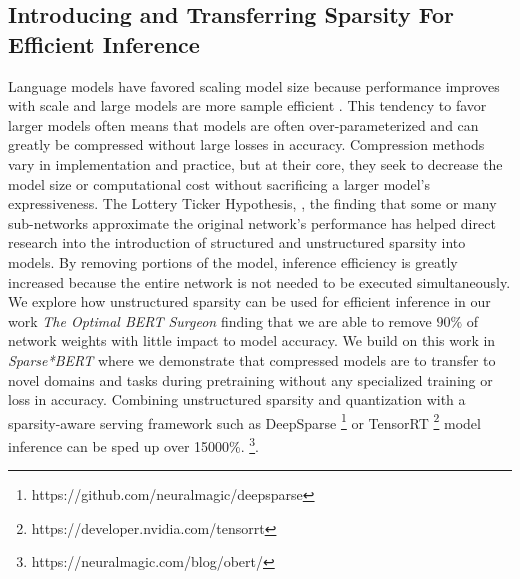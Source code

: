 \subsection{Introducing and Transferring Sparsity For Efficient Inference}
Language models have favored scaling model size because performance improves with scale \cite{Hestness2017DeepLS} \cite{Hernandez2021ScalingLF} and large models are more sample efficient \cite{Kaplan2020ScalingLF}. This tendency to favor larger models often means that models are often over-parameterized and can greatly be compressed without large losses in accuracy. Compression methods vary in implementation and practice, but at their core, they seek to decrease the model size or computational cost without sacrificing a larger model's expressiveness. The Lottery Ticker Hypothesis, \cite{Frankle2019TheLT}, \cite{Chen2020TheLT} the finding that some or many sub-networks approximate the original network's performance has helped direct research into the introduction of structured and unstructured sparsity into models. By removing portions of the model, inference efficiency is greatly increased because the entire network is not needed to be executed simultaneously. \\
We explore how unstructured sparsity can be used for efficient inference in our work 
 \textit{The Optimal BERT Surgeon} \cite{Kurtic2022TheOB} finding that we are able to remove $90\%$ of network weights with little impact to model accuracy. We build on this work in \textit{Sparse*BERT} \cite{Campos2022SparseBERTSM} where we demonstrate that compressed models are to transfer to novel domains and tasks during pretraining without any specialized training or loss in accuracy. Combining unstructured sparsity and quantization with a sparsity-aware serving framework such as DeepSparse \footnote{https://github.com/neuralmagic/deepsparse} or TensorRT \footnote{https://developer.nvidia.com/tensorrt} model inference can be sped up over 15000\%. \footnote{https://neuralmagic.com/blog/obert/}.
